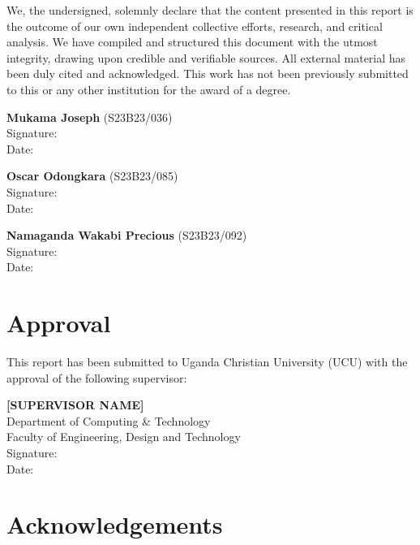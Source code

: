 \documentclass[12pt,a4paper]{report}
\begin{document}
We, the undersigned, solemnly declare that the content presented in this report is the
outcome of our own independent collective efforts, research, and critical analysis. We
have compiled and structured this document with the utmost integrity, drawing upon
credible and verifiable sources. All external material has been duly cited and
acknowledged. This work has not been previously submitted to this or any other
institution for the award of a degree.

\vspace{1.5cm}

\noindent\textbf{Mukama Joseph} (S23B23/036)\\[0.3cm]
Signature: \dotfill\\[0.4cm]
Date: \dotfill

\vspace{1cm}

\noindent\textbf{Oscar Odongkara} (S23B23/085)\\[0.3cm]
Signature: \dotfill\\[0.4cm]
Date: \dotfill

\vspace{1cm}

\noindent\textbf{Namaganda Wakabi Precious} (S23B23/092)\\[0.3cm]
Signature: \dotfill\\[0.4cm]
Date: \dotfill

\chapter*{Approval}

This report has been submitted to Uganda Christian University (UCU) with the approval
of the following supervisor:

\vspace{1.5cm}

\noindent\textbf{[SUPERVISOR NAME]}\\
Department of Computing \& Technology\\
Faculty of Engineering, Design and Technology\\[0.6cm]
Signature: \dotfill\\[0.4cm]
Date: \dotfill

\chapter*{Acknowledgements}
\end{document}
